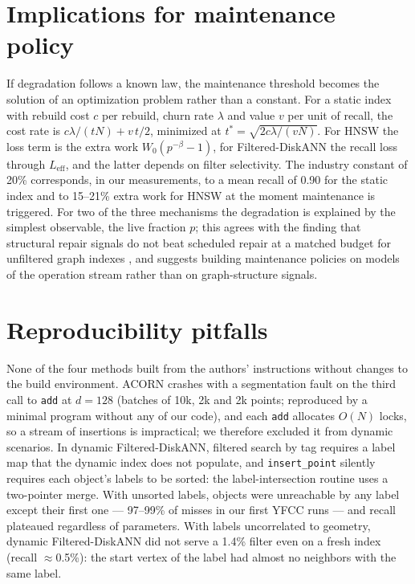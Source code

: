 \documentclass[10pt,a4paper]{article}
\begin{document}
\section{Implications for maintenance policy}

If degradation follows a known law, the maintenance threshold becomes the solution of an optimization problem rather than a constant. For a static index with rebuild cost $c$ per rebuild, churn rate $\lambda$ and value $v$ per unit of recall, the cost rate is $c\lambda/(t N) + v\,t/2$, minimized at $t^\ast = \sqrt{2c\lambda/(vN)}$. For HNSW the loss term is the extra work $W_0(p^{-\beta}-1)$, for Filtered-DiskANN the recall loss through $L_{\text{eff}}$, and the latter depends on filter selectivity. The industry constant of 20\% corresponds, in our measurements, to a mean recall of 0.90 for the static index and to 15--21\% extra work for HNSW at the moment maintenance is triggered. For two of the three mechanisms the degradation is explained by the simplest observable, the live fraction $p$; this agrees with the finding that structural repair signals do not beat scheduled repair at a matched budget for unfiltered graph indexes \cite{repair}, and suggests building maintenance policies on models of the operation stream rather than on graph-structure signals.

\section{Reproducibility pitfalls}
\label{sec:pitfalls}

None of the four methods built from the authors' instructions without changes to the build environment. ACORN crashes with a segmentation fault on the third call to \texttt{add} at $d=128$ (batches of 10k, 2k and 2k points; reproduced by a minimal program without any of our code), and each \texttt{add} allocates $O(N)$ locks, so a stream of insertions is impractical; we therefore excluded it from dynamic scenarios. In dynamic Filtered-DiskANN, filtered search by tag requires a label map that the dynamic index does not populate, and \texttt{insert\_point} silently requires each object's labels to be sorted: the label-intersection routine uses a two-pointer merge. With unsorted labels, objects were unreachable by any label except their first one --- 97--99\% of misses in our first YFCC runs --- and recall plateaued regardless of parameters. With labels uncorrelated to geometry, dynamic Filtered-DiskANN did not serve a 1.4\% filter even on a fresh index (recall $\approx$0.5\%): the start vertex of the label had almost no neighbors with the same label.
\end{document}
